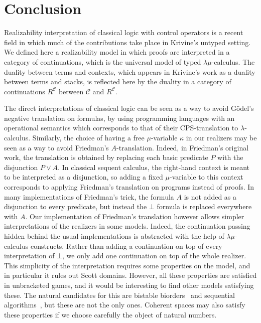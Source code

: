 \documentclass{CSML}
\newcommand*\LogBot\bot
\newcommand*\LogPredA{P}
\newcommand*\CatC{\mathcal{C}}
\newcommand*\CatR{R}
\newcommand*\CatRC{\CatExp{\CatR}{\CatC}}
\newcommand*\CatExp[2]{#1^{#2}}
\begin{document}
\section*{Conclusion}
Realizability interpretation of classical logic with control operators is a recent field in which much of the contributions take place in Krivine's untyped setting. We defined here a realizability model in which proofs are interpreted in a category of continuations, which is the universal model of typed $\lambda\mu$-calculus. The duality between terms and contexts, which appears in Krivine's work as a duality between terms and stacks, is reflected here by the duality in a category of continuations $\CatRC$ between $\CatC$ and $\CatRC$.\par
The direct interpretations of classical logic can be seen as a way to avoid G\"odel's negative translation on formulas, by using programming languages with an operational semantics which corresponds to that of their CPS-translation to $\lambda$-calculus. Similarly, the choice of having a free $\mu$-variable $\kappa$ in our realizers may be seen as a way to avoid Friedman's $A$-translation. Indeed, in Friedman's original work, the translation is obtained by replacing each basic predicate $\LogPredA$ with the disjunction $\LogPredA\vee A$. In classical sequent calculus, the right-hand context is meant to be interpreted as a disjunction, so adding a fixed $\mu$-variable to this context corresponds to applying Friedman's translation on programs instead of proofs. In many implementations of Friedman's trick, the formula $A$ is not added as a disjunction to every predicate, but instead the $\LogBot$ formula is replaced everywhere with $A$. Our implementation of Friedman's translation however allows simpler interpretations of the realizers in some models. Indeed, the continuation passing hidden behind the usual implementations is abstracted with the help of $\lambda\mu$-calculus constructs. Rather than adding a continuation on top of every interpretation of $\LogBot$, we only add one continuation on top of the whole realizer. This simplicity of the interpretation requires some properties on the model, and in particular it rules out Scott domains. However, all these properties are satisfied in unbracketed games, and it would be interesting to find other models satisfying these. The natural candidates for this are bistable biorders~\cite{LairdBistable} and sequential algorithms~\cite{BerryCurienSequential}, but these are not the only ones. Coherent spaces may also satisfy these properties if we choose carefully the object of natural numbers.\par
\end{document}
